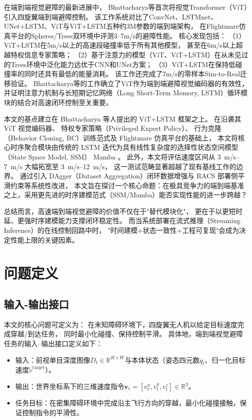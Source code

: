在端到端视觉避障的最新进展中，
Bhattacharya等\cite{Bhattacharya2025ViTFly}首次将视觉Transformer（ViT）引入四旋翼端到端避障控制。
该工作系统对比了ConvNet、LSTMnet、UNet+LSTM、ViT与ViT+LSTM五种约3M参数的端到端架构，
在Flightmare仿真平台的Spheres/Trees双环境中评测3--7m/s的避障性能。
核心发现包括：
（1）ViT+LSTM在5m/s以上的高速段碰撞率低于所有其他模型，
甚至在6m/s以上超越特权信息专家策略；
（2）基于注意力的模型（ViT、ViT+LSTM）在从未见过的Trees环境中泛化能力远优于CNN和UNet方案；
（3）ViT+LSTM在保持低碰撞率的同时还具有最低的能量消耗。
该工作还完成了7m/s的零样本Sim-to-Real迁移验证。
Bhattacharya等的工作确立了ViT作为端到端避障视觉编码器的有效性，
并证明注意力机制与长短期记忆网络（Long Short-Term Memory, LSTM）循环模块的结合对高速闭环控制至关重要。

本文的基点建立在 Bhattacharya 等人提出的 ViT+LSTM 框架之上。
在沿袭其 ViT 视觉编码器、
特权专家策略（Privileged Expert Policy）、
行为克隆（Behavior Cloning, BC）训练范式及 Flightmare 仿真平台的基础上，
本文将核心时序聚合模块由传统的 LSTM 迭代为具有线性复杂度的选择性状态空间模型（State Space Model, SSM） Mamba \cite{Gu2023Mamba}。
此外，本文将评估速度区间从 \SI{3}{m/s}--\SI{7}{m/s} 大幅拓宽至 \SI{3}{m/s}--\SI{12}{m/s}，
这一测试范畴显著超越了现有基线工作的边界。
通过引入 DAgger（Dataset Aggregation）闭环数据增强与 RACS 部署侧平滑约束等系统性改进，
本文旨在探讨一个核心命题：在极具竞争力的端到端基准之上，采用更先进的时序建模范式（SSM/Mamba）能否实现性能的进一步跨越？

总结而言，高速端到端视觉避障的价值不仅在于"替代模块化"，
更在于以更短时延、更强时序建模能力支撑闭环稳定性。
而当系统部署在流式推理（Streaming Inference）的在线控制回路中时，
"时间建模+状态一致性+工程可复现"会成为决定性能上限的关键因素。


\section{问题定义}

\subsection{输入-输出接口}

本文的核心问题可定义为：
在未知障碍环境下，四旋翼无人机以给定目标速度完成穿越/到达任务，
同时最小化碰撞、保持控制平滑。
具体地，端到端视觉避障任务的输入--输出接口定义如下：

\begin{itemize}
  \item 输入：前视单目深度图像$D_t \in \mathbb{R}^{H \times W}$与本体状态（姿态四元数$q_t$、归一化目标速度$\tilde{v}^{\text{target}}$）。
  \item 输出：世界坐标系下的三维速度指令$\mathbf{v}_t = [v^x_t, v^y_t, v^z_t] \in \mathbb{R}^3$。
  \item 任务目标：在密集障碍环境中完成沿主飞行方向的穿越，最小化碰撞接触，保证控制指令的平滑性。
\end{itemize}

